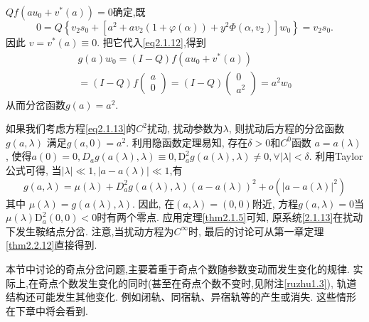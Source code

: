 \begin{example}
\(Q f\left(a u_{0}+v^{*}(a)\right)=0\)确定,既
\begin{equation*}
0=Q\left\{v_{2} s_{0}+\left[a^{2}+a v_{2}(1+\varphi(\alpha))+y^{2} \Phi\left(\alpha, v_{2}\right)\right] w_{0}\right\}=v_{2} s_{0}.
\end{equation*}
因此
\(v=v^{*}(a) \equiv 0\).
把它代入\eqref{eq2.1.12},得到
\begin{equation*}
\begin{array}{c}{g(a) w_{0}=(I-Q) f\left(a u_{0}+v^{*}(a)\right)} \\ {=(I-Q) f \left( \begin{array}{l}{a} \\ {0}\end{array}\right)=(I-Q) \left( \begin{array}{l}{0} \\ {a^{2}}\end{array}\right)=a^{2} w_{0}}\end{array}
\end{equation*}
从而分岔函数\(g(a)=a^{2}\).
\end{example}
\par
如果我们考虑方程\eqref{eq2.1.13}的\(C^{2}\)扰动,
扰动参数为\(\lambda\),
则扰动后方程的分岔函数\(g(a,\lambda)\)
满足\(g(a,0)=a^{2}\).
利用隐函数定理易知,
存在\(\delta>0\)和\(C^{0}\)函数
\(a=a(\lambda)\),
使得\(a(0)=0, D_{a} g(a(\lambda), \lambda) \equiv 0,
\mathrm{D}_{a}^{2} g(a(\lambda), \lambda) \neq 0, \forall|\lambda|<\delta\).
利用Taylor公式可得,
当\(|\lambda| \ll 1,|a-a(\lambda)| \ll 1 \),有
\begin{equation*}
g(a, \lambda)=\mu(\lambda)+D_{a}^{2} g(a(\lambda), \lambda)(a-a(\lambda))^{2}+o\left(|a-a(\lambda)|^{2}\right)
\end{equation*}
其中
\(\mu(\lambda)=g(a(\lambda), \lambda)\).
因此,
在\((a,\lambda)=(0,0)\)附近,
方程\(g(a,\lambda)=0\)当\(\mu(\lambda) \mathrm{D}_{a}^{2}(0,0)<0\)时有两个零点.
应用定理\ref{thm2.1.5}可知,
原系统\eqref{2.1.13}在扰动下发生鞍结点分岔.
注意,当扰动方程为\(C^{\infty}\)时,
最后的讨论可从第一章定理\ref{thm2.2.12}直接得到.
\begin{note}
  本节中讨论的奇点分岔问题,主要着重于奇点个数随参数变动而发生变化的规律.
  实际上,在奇点个数发生变化的同时(甚至在奇点个数不变时,见附注\ref{ruzhu1.3}),
  轨道结构还可能发生其他变化.
  例如闭轨、同宿轨、异宿轨等的产生或消失.
  这些情形在下章中将会看到.
\end{note}

